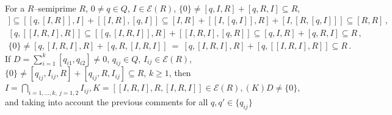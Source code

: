 \documentclass[a4paper,11pt]{article}
\begin{document}
For a $R$--semiprime $R$, ${0\ne q\in Q}$, ${I\in \mathcal{E}(R)}$, 
${\{0\}\ne [q, I, R]+[q, R, I]\subseteq R}$, 
\begin{gather*}
[q, [I, R, I]]\subseteq [[q, [I, R]], I]+[[I, R], [q, I]]\subseteq
[I, R]+[[I, [q, I]], R]+[I, [R, [q, I]]]\subseteq [R, R]\,,
\\
[q, [[I, R, I], R]]\subseteq [[q, [I, R, I]], R]+[[I, R, I], [q, R]]
\subseteq [q, I, R]+[q, R, I]\subseteq R\,,
\\
\{0\}\ne [q, [I, R, I], R]+[q, R, [I, R, I]]\ =\ 
[q, [I, R, I], R]+[q, [[I, R, I], R]]\subseteq R\,.
\end{gather*}
If ${D=\sum\limits_{i=1}^k [q_{i1}, q_{i2}]\ne 0}$, ${q_{ij}\in Q}$, 
${I_{ij}\in \mathcal{E}(R)}$, 
${\{0\}\ne [q_{ij}, I_{ij}, R]+[q_{ij}, R, I_{ij}]\subseteq R}$, ${k\geq 1}$, 
then ${I=\bigcap\limits_{i=1, \ldots, k,\ j=1, 2} I_{ij}, 
K=[[I, R, I], R, [I, R, I]]\in \mathcal{E}(R), (K)D\ne \{0\}}$, and 
taking into account the previous comments for all ${q, q'\in \{q_{ij}\}}$ 
\end{document}
